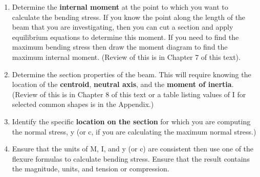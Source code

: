 \documentclass[
  letterpaper,
  DIV=11,
  numbers=noendperiod]{scrreprt}
\providecommand{\tightlist}{%
  \setlength{\itemsep}{0pt}\setlength{\parskip}{0pt}}\usepackage{longtable,booktabs,array}
\begin{document}
\begin{tcolorbox}[enhanced jigsaw, colback=white, colframe=quarto-callout-note-color-frame, leftrule=.75mm, opacitybacktitle=0.6, colbacktitle=quarto-callout-note-color!10!white, arc=.35mm, bottomrule=.15mm, breakable, title={Step-by-step: Calculating Bending Stress}, left=2mm, titlerule=0mm, toptitle=1mm, toprule=.15mm, opacityback=0, rightrule=.15mm, coltitle=black, bottomtitle=1mm]

\begin{enumerate}
\def\labelenumi{\arabic{enumi}.}
\tightlist
\item
  Determine the \textbf{internal moment} at the point to which you want
  to calculate the bending stress. If you know the point along the
  length of the beam that you are investigating, then you can cut a
  section and apply equilibrium equations to determine this moment. If
  you need to find the maximum bending stress then draw the moment
  diagram to find the maximum internal moment. (Review of this is in
  Chapter 7 of this text).
\item
  Determine the section properties of the beam. This will require
  knowing the location of the \textbf{centroid}, \textbf{neutral axis},
  and the \textbf{moment of inertia}. (Review of this is in Chapter 8 of
  this text or a table listing values of I for selected common shapes is
  in the Appendix.)
\item
  Identify the specific \textbf{location on the section} for which you
  are computing the normal stress, y (or c, if you are calculating the
  maximum normal stress.)
\item
  Ensure that the units of M, I, and y (or c) are consistent then use
  one of the flexure formulas to calculate bending stress. Ensure that
  the result contains the magnitude, units, and tension or compression.
\end{enumerate}

\end{tcolorbox}
\end{document}
